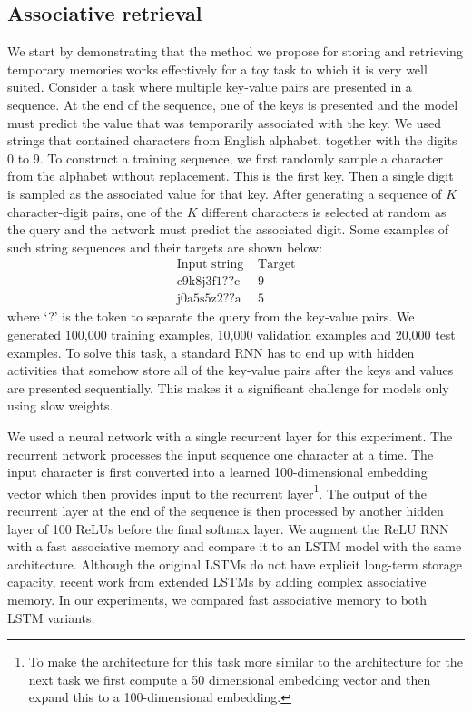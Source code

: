\documentclass{article}
\begin{document}
\subsection{Associative retrieval} \label{section:retrieval}
We start by demonstrating that the method we propose for storing and retrieving temporary memories works effectively for a toy task to which it is very well suited.  Consider a task where multiple key-value pairs are presented in a sequence. At the end of the sequence, one of the keys is presented and the model must predict the value that was temporarily associated with the key.  We used strings that contained characters from English alphabet, together with the digits 0 to 9. To construct a training sequence, we first randomly sample a character from the alphabet without replacement. This is the first key. Then a single digit is sampled as the associated value for that key.  After generating a sequence of $K$ character-digit pairs, one of the $K$ different characters is selected at random as the query and the network must predict the associated digit. Some examples of such string sequences and their targets are shown below:
\begin{align}
  \text{Input string}& \text{\ \  Target} \nonumber  \\
  \text{c9k8j3f1??c}& \text{\ \ \ \ 9} \nonumber  \\
  \text{j0a5s5z2??a}& \text{\ \ \ \ 5} \nonumber
\end{align}
where `?' is the token to separate the query from the key-value pairs. We generated 100,000 training examples, 10,000 validation examples and 20,000 test examples.  To solve this task, a standard RNN has to end up with hidden activities that somehow store all of the key-value pairs after the keys and values are presented sequentially. This makes it a significant challenge for models only using slow weights.

We used a neural network with a single recurrent layer for this experiment. The recurrent network processes the input sequence one character at a time. The input character is first converted into a learned 100-dimensional embedding vector which then provides input to the recurrent layer\footnote{To make the architecture for this task more similar to the architecture for the next task we first compute a 50 dimensional embedding vector and then expand this to a 100-dimensional embedding.}.  The output of the recurrent layer at the end of the sequence is then processed by another hidden layer of 100 ReLUs before the final softmax layer.  We augment the ReLU RNN with a fast associative memory and compare it to an LSTM model with the same architecture. Although the original LSTMs do not have explicit long-term storage capacity, recent work from \cite{danihelka2016associative} extended LSTMs by adding complex associative memory. In our experiments, we compared fast associative memory to both LSTM variants. 
\end{document}
